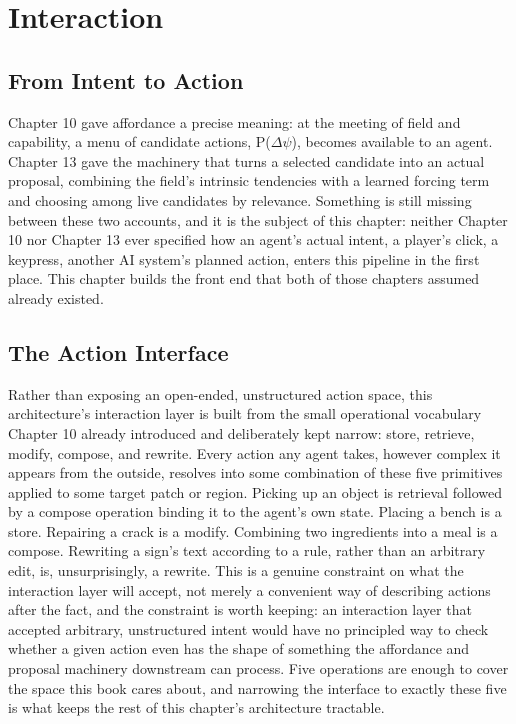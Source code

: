 \chapter{Interaction}

\section{From Intent to Action}

Chapter 10 gave affordance a precise meaning: at the meeting of field and capability, a menu of candidate actions, P(\(\Delta\psi\)), becomes available to an agent. Chapter 13 gave the machinery that turns a selected candidate into an actual proposal, combining the field's intrinsic tendencies with a learned forcing term and choosing among live candidates by relevance. Something is still missing between these two accounts, and it is the subject of this chapter: neither Chapter 10 nor Chapter 13 ever specified how an agent's actual intent, a player's click, a keypress, another AI system's planned action, enters this pipeline in the first place. This chapter builds the front end that both of those chapters assumed already existed.

\section{The Action Interface}

Rather than exposing an open-ended, unstructured action space, this architecture's interaction layer is built from the small operational vocabulary Chapter 10 already introduced and deliberately kept narrow: store, retrieve, modify, compose, and rewrite. Every action any agent takes, however complex it appears from the outside, resolves into some combination of these five primitives applied to some target patch or region. Picking up an object is retrieval followed by a compose operation binding it to the agent's own state. Placing a bench is a store. Repairing a crack is a modify. Combining two ingredients into a meal is a compose. Rewriting a sign's text according to a rule, rather than an arbitrary edit, is, unsurprisingly, a rewrite. This is a genuine constraint on what the interaction layer will accept, not merely a convenient way of describing actions after the fact, and the constraint is worth keeping: an interaction layer that accepted arbitrary, unstructured intent would have no principled way to check whether a given action even has the shape of something the affordance and proposal machinery downstream can process. Five operations are enough to cover the space this book cares about, and narrowing the interface to exactly these five is what keeps the rest of this chapter's architecture tractable.

